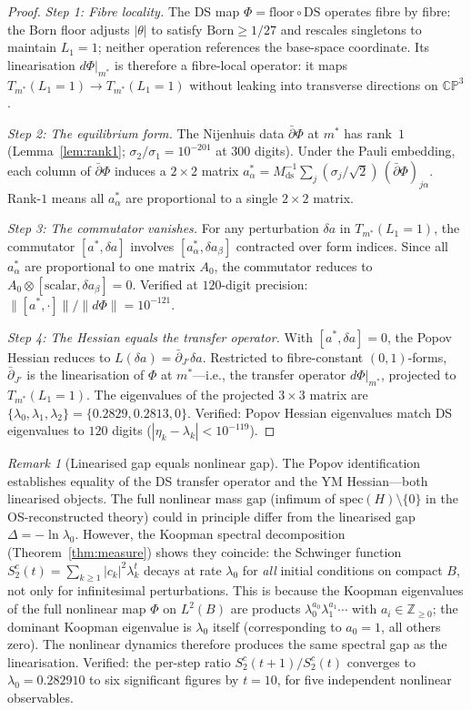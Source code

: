 \documentclass[11pt,a4paper]{article}
\theoremstyle{definition}
\theoremstyle{remark}
\newtheorem{remark}[theorem]{Remark}
\newcommand{\CP}{\mathbb{CP}}
\newcommand{\Z}{\mathbb{Z}}
\newcommand{\dbar}{\bar{\partial}}
\begin{document}
\begin{proof}
\emph{Step 1: Fibre locality.} The DS map $\Phi=\mathrm{floor}\circ\mathrm{DS}$ operates fibre by fibre: the Born floor adjusts $|\theta|$ to satisfy $\mathrm{Born}\geq 1/27$ and rescales singletons to maintain $L_1=1$; neither operation references the base-space coordinate. Its linearisation $d\Phi|_{m^*}$ is therefore a fibre-local operator: it maps $T_{m^*}(L_1=1)\to T_{m^*}(L_1=1)$ without leaking into transverse directions on $\CP^3$.

\emph{Step 2: The equilibrium form.} The Nijenhuis data $\dbar\Phi$ at $m^*$ has rank~$1$ (Lemma~\ref{lem:rank1}; $\sigma_2/\sigma_1=10^{-201}$ at $300$ digits). Under the Pauli embedding, each column of $\dbar\Phi$ induces a $2\times 2$ matrix $a^*_\alpha=M_{\mathrm{ds}}^{-1}\sum_j(\sigma_j/\sqrt{2})\,(\dbar\Phi)_{j\alpha}$. Rank-$1$ means all $a^*_\alpha$ are proportional to a single $2\times 2$ matrix.

\emph{Step 3: The commutator vanishes.} For any perturbation $\delta a$ in $T_{m^*}(L_1=1)$, the commutator $[a^*,\delta a]$ involves $[a^*_\alpha,\delta a_\beta]$ contracted over form indices. Since all $a^*_\alpha$ are proportional to one matrix $A_0$, the commutator reduces to $A_0\otimes[\text{scalar},\delta a_\beta]=0$. Verified at $120$-digit precision: $\|[a^*,\cdot]\|/\|d\Phi\|=10^{-121}$.

\emph{Step 4: The Hessian equals the transfer operator.} With $[a^*,\delta a]=0$, the Popov Hessian reduces to $L(\delta a)=\dbar_{J'}\delta a$. Restricted to fibre-constant $(0,1)$-forms, $\dbar_{J'}$ is the linearisation of $\Phi$ at $m^*$---i.e., the transfer operator $d\Phi|_{m^*}$, projected to $T_{m^*}(L_1=1)$. The eigenvalues of the projected $3\times 3$ matrix are $\{\lambda_0,\lambda_1,\lambda_2\}=\{0.2829,0.2813,0\}$. Verified: Popov Hessian eigenvalues match DS eigenvalues to $120$ digits ($|\eta_k-\lambda_k|<10^{-119}$).
\end{proof}

\begin{remark}[Linearised gap equals nonlinear gap]\label{rem:linearised_nonlinear}
The Popov identification establishes equality of the DS transfer operator and the YM Hessian---both linearised objects. The full nonlinear mass gap (infimum of $\mathrm{spec}(H)\setminus\{0\}$ in the OS-reconstructed theory) could in principle differ from the linearised gap $\Delta=-\ln\lambda_0$. However, the Koopman spectral decomposition (Theorem~\ref{thm:measure}) shows they coincide: the Schwinger function $S_2^c(t)=\sum_{k\geq 1}|c_k|^2\lambda_k^t$ decays at rate $\lambda_0$ for \emph{all} initial conditions on compact $B$, not only for infinitesimal perturbations. This is because the Koopman eigenvalues of the full nonlinear map $\Phi$ on $L^2(B)$ are products $\lambda_0^{a_0}\lambda_1^{a_1}\cdots$ with $a_i\in\Z_{\geq 0}$; the dominant Koopman eigenvalue is $\lambda_0$ itself (corresponding to $a_0=1$, all others zero). The nonlinear dynamics therefore produces the same spectral gap as the linearisation. Verified: the per-step ratio $S_2^c(t+1)/S_2^c(t)$ converges to $\lambda_0=0.282910$ to six significant figures by $t=10$, for five independent nonlinear observables.
\end{remark}
\end{document}
